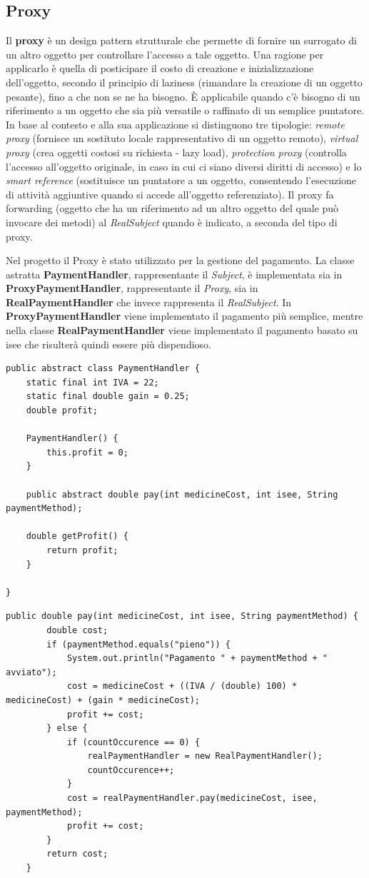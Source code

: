 \documentclass[a4paper, 10pt]{report}
\begin{document}
\subsection{Proxy}
Il \textbf{proxy} è un design pattern strutturale che permette di fornire un surrogato di un altro oggetto per controllare l'accesso a tale oggetto. Una ragione per applicarlo è quella di posticipare il costo di creazione e inizializzazione dell'oggetto, secondo il principio di laziness (rimandare la creazione di un oggetto pesante), fino a che non se ne ha bisogno. È applicabile quando c'è bisogno di un riferimento a un oggetto che sia più versatile o raffinato di un semplice puntatore. In base al contesto e alla sua applicazione si distinguono tre tipologie: \textit{remote proxy} (fornisce un sostituto locale rappresentativo di un oggetto remoto), \textit{virtual proxy} (crea oggetti costosi su richiesta - lazy load), \textit{protection proxy} (controlla l'accesso all'oggetto originale, in caso in cui ci siano diversi diritti di accesso) e lo \textit{smart reference} (sostituisce un puntatore a un oggetto, consentendo l'esecuzione di attività aggiuntive quando si accede all'oggetto referenziato). Il proxy fa forwarding (oggetto che ha un riferimento ad un altro oggetto del quale può invocare dei metodi) al \textit{RealSubject} quando è indicato, a seconda del tipo di proxy.

Nel progetto il Proxy è stato utilizzato per la gestione del pagamento. La classe astratta \textbf{PaymentHandler}, rappresentante il \textit{Subject}, è implementata sia in \textbf{ProxyPaymentHandler}, rappresentante il \textit{Proxy}, sia in \textbf{RealPaymentHandler} che invece rappresenta il \textit{RealSubject}. In \textbf{ProxyPaymentHandler} viene implementato il pagamento più semplice, mentre nella classe \textbf{RealPaymentHandler} viene implementato il pagamento basato su isee che risulterà quindi essere più dispendioso.\\
\begin{lstlisting}
public abstract class PaymentHandler {
    static final int IVA = 22;
    static final double gain = 0.25;
    double profit;

    PaymentHandler() {
        this.profit = 0;
    }

    public abstract double pay(int medicineCost, int isee, String paymentMethod);

    double getProfit() {
        return profit;
    }

}
\end{lstlisting}
\begin{lstlisting}
public double pay(int medicineCost, int isee, String paymentMethod) {
        double cost;
        if (paymentMethod.equals("pieno")) {
            System.out.println("Pagamento " + paymentMethod + " avviato");
            cost = medicineCost + ((IVA / (double) 100) * medicineCost) + (gain * medicineCost);
            profit += cost;
        } else {
            if (countOccurence == 0) {
                realPaymentHandler = new RealPaymentHandler();
                countOccurence++;
            }
            cost = realPaymentHandler.pay(medicineCost, isee, paymentMethod);
            profit += cost;
        }
        return cost;
    }
\end{lstlisting}
\end{document}
